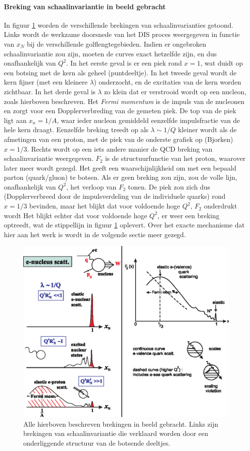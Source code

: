 \documentclass[a4paper,11pt]{article}
\numberwithin{equation}{section} %
\begin{document}
      \paragraph{Breking van schaalinvariantie in beeld gebracht}
In figuur \ref{fig:ScalingViolations} worden de verschillende brekingen van schaalinvarianties getoond.
Links wordt de werkzame doorsnede van het DIS proces weergegeven in functie van $x_N$ bij de verschillende golflengtegebieden.
Indien er ongebroken schaalinvariantie zou zijn, moeten de curves exact hetzelfde zijn, en dus onafhankelijk  van $Q^2$.
In het eerste geval is er een piek rond $x=1$, wat duidt op een botsing met de kern als geheel (puntdeeltje).
In het tweede geval wordt de kern fijner (met een kleinere $\lambda$) onderzocht, en de excitaties van de kern worden zichtbaar.
In het derde geval is $\lambda$ zo klein dat er verstrooid wordt op een nucleon, zoals hierboven beschreven.
Het \textit{Fermi momentum} is de impuls van de nucleonen en zorgt voor een Dopplerverbreding van de gemeten piek.
De top van de piek ligt aan $x_n=1/A$, waar ieder nucleon gemiddeld eenzelfde impulsfractie van de hele kern draagt.
Eenzelfde breking treedt op als $\lambda \sim 1/Q$ kleiner wordt als de afmetingen van een proton, met de piek van de onderste grafiek op (Bjorken) $x=1/3$.
Rechts wordt op een iets andere manier de QCD breking van schaalinvariantie weergegeven.
$F_2$ is de structuurfunctie van het proton, waarover later meer wordt gezegd.
Het geeft een waarschijnlijkheid om met een bepaald parton (quark/gluon) te botsen.
Als er geen breking zou zijn, zou de volle lijn, onafhankelijk van $Q^2$, het verloop van $F_2$ tonen.
De piek zou zich dus (Dopplerverbreed door de impulsverdeling van de individuele quarks) rond $x=1/3$ bevinden, maar het blijkt dat voor voldoende hoge $Q^2$, $F_2$ onderdrukt wordt 
Het blijkt echter dat voor voldoende hoge $Q^2$, er weer een breking optreedt, wat de stippellijn in figuur \ref{fig:ScalingViolations} oplevert.
Over het exacte mechanisme dat hier aan het werk is wordt in de volgende sectie meer gezegd.
\begin{figure} [H]
  \begin{center}
    \includegraphics[width=.66\textwidth]{Afbeeldingen/ScalingViolations.eps}
    \caption{Alle hierboven beschreven brekingen in beeld gebracht. Links zijn brekingen van schaalinvariantie die verklaard worden door een onderliggende structuur van de botsende deeltjes. \cite{Martin}}
   \label{fig:ScalingViolations}
  \end{center}
\end{figure}
\end{document}
